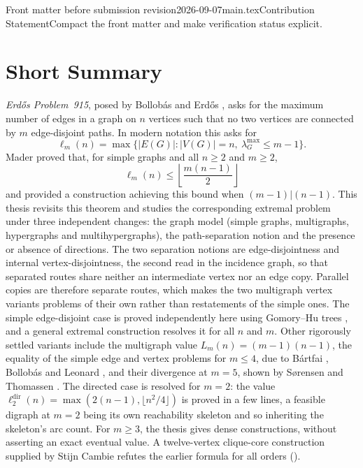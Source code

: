 \begin{offcut}{Front matter before submission revision}{2026-09-07}{main.tex}{Contribution Statement}{Compact the front matter and make verification status explicit.}
\chapter*{Short Summary}
\emph{Erd\H{o}s Problem~915}, posed by Bollob\'{a}s and Erd\H{o}s \cite{BollobasErdos62}, asks for the maximum number of edges in a graph on $n$ vertices such that no two vertices are connected by $m$ edge-disjoint paths. In modern notation this asks for
\[
\ell_m(n)=\max\{|E(G)|:|V(G)|=n,\ \lambda_G^{\max}\le m-1\}.
\]
Mader proved that, for simple graphs and all $n\ge2$ and $m\ge2$,
\[
\ell_m(n)\le\left\lfloor \frac{m(n-1)}2\right\rfloor
\]
and provided a construction achieving this bound when $(m-1)|(n-1)$.
This thesis revisits this theorem and studies the corresponding extremal problem under three independent changes: the graph model (simple graphs, multigraphs, hypergraphs and multihypergraphs), the path-separation notion and the presence or absence of directions.
The two separation notions are edge-disjointness and internal vertex-disjointness, the second read in the incidence graph, so that separated routes share neither an intermediate vertex nor an edge copy.
Parallel copies are therefore separate routes, which makes the two multigraph vertex variants problems of their own rather than restatements of the simple ones.
The simple edge-disjoint case is proved independently here using Gomory--Hu trees \cite{GomoryHu61}, and a general extremal construction resolves it for all $n$ and $m$.
Other rigorously settled variants include the multigraph value $L_m(n)=(m-1)(n-1)$, the equality of the simple edge and vertex problems for $m\le4$, due to B\'{a}rtfai \cite{Bartfai60}, Bollob\'{a}s \cite{Bollobas66} and Leonard \cite{Leonard72b}, and their divergence at $m=5$, shown by S{\o}rensen and Thomassen \cite{SorensenThomassen74}.
The directed case is resolved for $m=2$: the value $\ell_2^{\mathrm{dir}}(n)=\max(2(n-1),\lfloor n^2/4\rfloor)$ is proved in a few lines, a feasible digraph at $m=2$ being its own reachability skeleton and so inheriting the skeleton's arc count. For $m\ge3$, the thesis gives dense constructions, without asserting an exact eventual value. A twelve-vertex clique-core construction supplied by Stijn Cambie refutes the earlier formula for all orders ().



\end{offcut}
